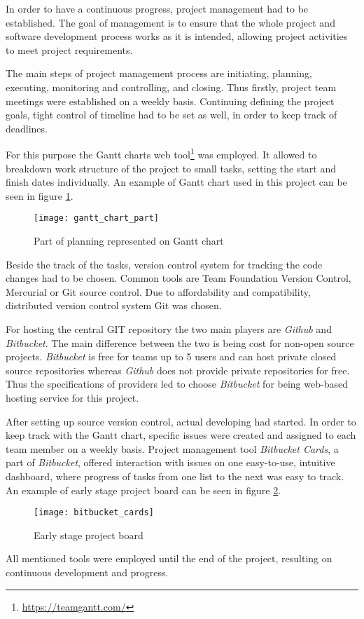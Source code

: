 In order to have a continuous progress, project management had to be established. The goal of management is to ensure that the whole project and software development process works as it is intended, allowing project activities to meet project requirements.

The main steps of project management process are initiating, planning, executing, monitoring and controlling, and closing. Thus firstly, project team meetings were established on a weekly basis. Continuing defining the project goals, tight control of timeline had to be set as well, in order to keep track of deadlines.

For this purpose the Gantt charts web tool\footnote{\url{https://teamgantt.com/}} was employed. It allowed to breakdown work structure of the project to small tasks, setting the start and finish dates individually. An example of Gantt chart used in this project can be seen in figure \ref{fig:gannt_example}.

\begin{figure}[ht!]
	\centering
	\texttt{[image: gantt\_chart\_part]}
	\caption{Part of planning represented on Gantt chart}
	\label{fig:gannt_example}
\end{figure}

Beside the track of the tasks, version control system for tracking the code changes had to be chosen. Common tools are Team Foundation Version Control, Mercurial or Git source control. Due to affordability and compatibility, distributed version control system Git was chosen. 

For hosting the central GIT repository the two main players are \textit{Github} and \textit{Bitbucket}.
The main difference between the two is being cost for non-open source projects. \textit{Bitbucket} is free for teams up to 5 users and can host private closed source repositories whereas \textit{Github} does not provide private repositories for free. Thus the specifications of providers led to choose \textit{Bitbucket} for being web-based hosting service for this project.

After setting up source version control, actual developing had started. In order to keep track with the Gantt chart, specific issues were created and assigned to each team member on a weekly basis. Project management tool \textit{Bitbucket Cards}, a part of \textit{Bitbucket}, offered interaction with issues on one easy-to-use, intuitive dashboard, where progress of tasks from one list to the next was easy to track. An example of early stage project board can be seen in figure \ref{fig:bitcards}.

\begin{figure}[ht!]
	\centering
	\texttt{[image: bitbucket\_cards]}
	\caption{Early stage project board}
	\label{fig:bitcards}
\end{figure}

All mentioned tools were employed until the end of the project, resulting on continuous development and progress.